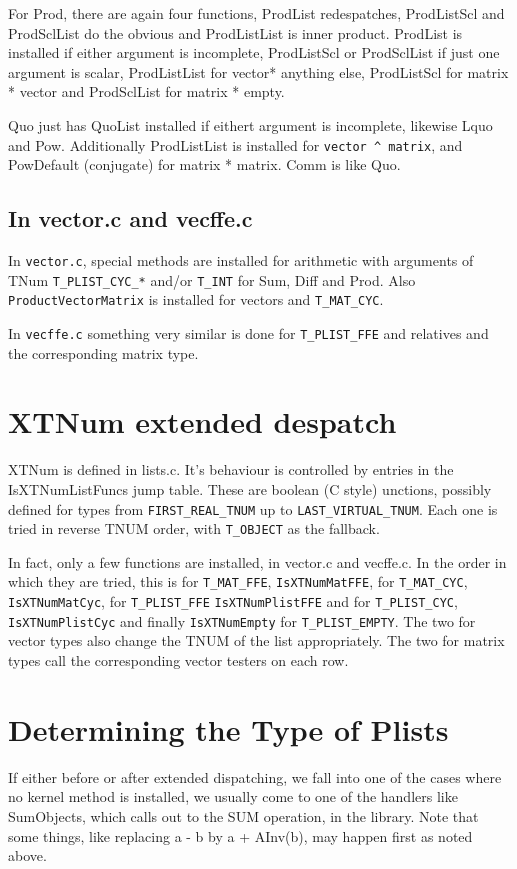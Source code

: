 \documentclass{article}
\begin{document}
For Prod, there are again four functions, ProdList redespatches,
ProdListScl and ProdSclList do the obvious and ProdListList is inner
product. ProdList is installed if either argument is incomplete,
ProdListScl or ProdSclList if just one argument is scalar,
ProdListList for vector* anything else, ProdListScl
for matrix * vector and ProdSclList for matrix * empty. 

Quo just has QuoList installed if eithert argument is incomplete,
likewise Lquo and Pow. Additionally ProdListList is installed for
\verb|vector ^ matrix|, and PowDefault (conjugate) for matrix * matrix. Comm
is like Quo.

\subsection{In vector.c and vecffe.c}

In \verb|vector.c|, special methods are installed for arithmetic with
arguments of TNum \verb|T_PLIST_CYC_*| and/or \verb|T_INT| for Sum, Diff and
Prod. Also \verb|ProductVectorMatrix| is installed for vectors and
\verb|T_MAT_CYC|.

In \verb|vecffe.c| something very similar is done for
\verb|T_PLIST_FFE| and relatives and the corresponding matrix type.



\section{XTNum extended despatch}

XTNum is defined in lists.c. It's behaviour is controlled by entries
in the IsXTNumListFuncs jump table. These are boolean (C style)
unctions, possibly defined for types from \verb|FIRST_REAL_TNUM| up to
\verb|LAST_VIRTUAL_TNUM|. Each one is tried in reverse TNUM order, with
\verb|T_OBJECT| as the fallback.

In fact, only a few functions are installed, in vector.c and
vecffe.c. In the order in which they are tried, this is for \verb|T_MAT_FFE|,
\verb|IsXTNumMatFFE|, for \verb|T_MAT_CYC|, \verb|IsXTNumMatCyc|, for \verb|T_PLIST_FFE|
\verb|IsXTNumPlistFFE| and for \verb|T_PLIST_CYC|, \verb|IsXTNumPlistCyc| and finally
\verb|IsXTNumEmpty| for \verb|T_PLIST_EMPTY|. The two for vector types also change
the TNUM of the list appropriately. The two for matrix types call the
corresponding vector testers on each row.

\section{Determining the Type of Plists}
If either before or after extended dispatching, we fall into one of
the cases where no kernel method is installed, we usually come to one
of the handlers like SumObjects, which calls out to the SUM operation,
in the library. Note that some things, like replacing a - b by a +
AInv(b), may happen first as noted above.
\end{document}

